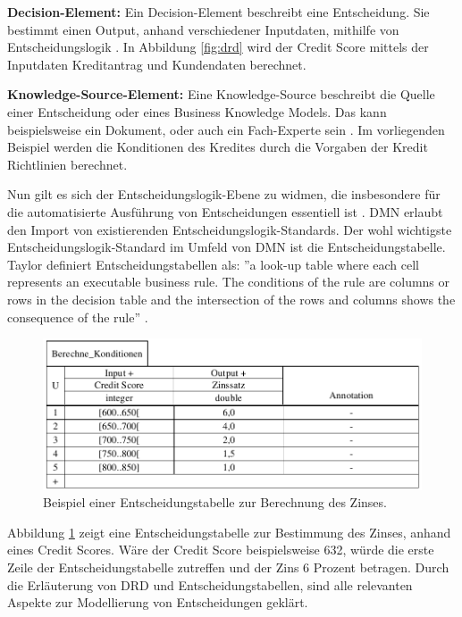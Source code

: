 \textbf{Decision-Element:} Ein Decision-Element beschreibt eine Entscheidung. Sie bestimmt einen Output, anhand verschiedener Inputdaten, mithilfe von Entscheidungslogik \cite[vgl. S. 20]{OM16}. In Abbildung \ref{fig:drd} wird der Credit Score mittels der Inputdaten Kreditantrag und Kundendaten berechnet.

\textbf{Knowledge-Source-Element:} Eine Knowledge-Source beschreibt die Quelle einer Entscheidung oder eines Business Knowledge Models. Das kann beispielsweise ein Dokument, oder auch ein Fach-Experte sein \cite[vgl. S. 18]{OM16}. Im vorliegenden Beispiel werden die Konditionen des Kredites durch die Vorgaben der Kredit Richtlinien berechnet.

Nun gilt es sich der Entscheidungslogik-Ebene zu widmen, die insbesondere für die automatisierte Ausführung von Entscheidungen essentiell ist \cite[vgl. S. 18]{OM16}. DMN erlaubt den Import von existierenden Entscheidungslogik-Standards. Der wohl wichtigste Entscheidungslogik-Standard im Umfeld von DMN ist die Entscheidungstabelle. Taylor definiert Entscheidungstabellen als: ''a look-up table where each cell represents an executable business rule. The conditions of the rule are columns or rows in the decision table and the intersection of the rows and columns shows the consequence of the rule'' \cite[S. 132]{JT11}. 

\begin{figure}[ht]
\centering
\includegraphics{images/decisiontable.pdf}
\caption{Beispiel einer Entscheidungstabelle zur Berechnung des Zinses.}
\label{fig:decisiontable}
\end{figure} 


Abbildung \ref{fig:decisiontable} zeigt eine Entscheidungstabelle zur Bestimmung des Zinses, anhand eines Credit Scores. Wäre der Credit Score beispielsweise 632, würde die erste Zeile der Entscheidungstabelle zutreffen und der Zins 6 Prozent betragen. Durch die Erläuterung von DRD und Entscheidungstabellen, sind alle relevanten Aspekte zur Modellierung von Entscheidungen geklärt. 


